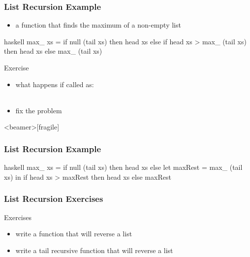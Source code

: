\documentclass[dvipsnames]{beamer}
\theoremstyle{plain}
\begin{document}
\begin{frame}[fragile]
  \frametitle{List Recursion Example}

  \begin{example}
    \begin{itemize}
      \item a function that finds the maximum of a non-empty list
    \end{itemize}

    \pause
    \begin{pygments}{haskell}
max_ xs =
    if null (tail xs)
    then head xs
    else if head xs > max_ (tail xs)
         then head xs
         else max_ (tail xs)
    \end{pygments}
  \end{example}

  \pause
  \begin{block}{Exercise}
    \begin{itemize}
      \item what happens if called as:\\
        \\
      \item fix the problem
   \end{itemize}
  \end{block}
\end{frame}

\begin{frame}<beamer>[fragile]
  \frametitle{List Recursion Example}

  \begin{example}
    \begin{pygments}{haskell}
max_ xs =
    if null (tail xs)
    then head xs
    else
        let
            maxRest = max_ (tail xs)
        in
            if head xs > maxRest
            then head xs
            else maxRest
    \end{pygments}
  \end{example}
\end{frame}

\begin{frame}
  \frametitle{List Recursion Exercises}

  \begin{block}{Exercises}
    \begin{itemize}
      \item write a function that will reverse a list
      \item write a tail recursive function that will reverse a list
    \end{itemize}
  \end{block}
\end{frame}
\end{document}
